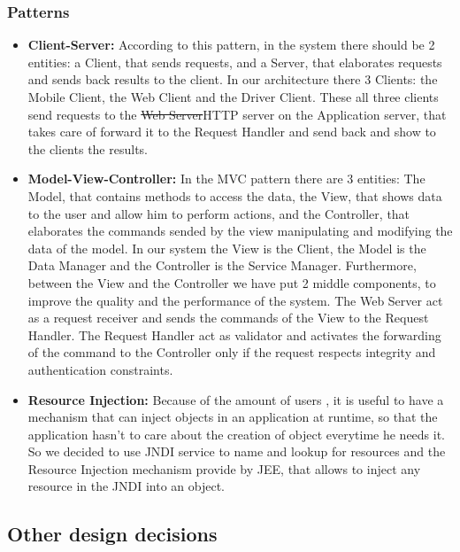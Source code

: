 \subsubsection{Patterns}

\begin{itemize}
\item {\textbf{Client-Server:}} According to this pattern, in the system there should be 2 entities: a Client, that sends requests, and a Server, that elaborates requests and sends back results to the client. In our architecture there 3 Clients: the Mobile Client, the Web Client and the Driver Client. These all three  clients send requests to the \st{Web Server}HTTP server on the Application server, that takes care of forward it to the Request Handler and send back and show to the clients the results.


\item{\textbf{Model-View-Controller:}} In the MVC pattern there are 3 entities: The Model, that contains methods to access the data, the View, that shows data to the user and allow him to perform actions, and the Controller, that elaborates the commands sended by the view manipulating and modifying  the data of the model.
In our system the View is the Client, the Model is the Data Manager and the Controller is the Service Manager. Furthermore, between the View and the Controller we have put 2 middle components, to improve the quality and the performance of the system. The Web Server act as a request receiver and sends the commands of the View to the Request Handler. The Request Handler act as validator and activates the forwarding of the command to the Controller only if the request respects integrity and authentication constraints.

\item{\textbf{Resource Injection:}} Because of the amount of users , it is useful to have a mechanism that can inject objects in an application at runtime, so that the application hasn't to care about the creation of object everytime he needs it. So we decided to use JNDI service to name and lookup for resources and the Resource Injection mechanism provide by JEE, that allows to inject any resource in the JNDI into an object.

\end{itemize}



\subsection{Other design decisions }
